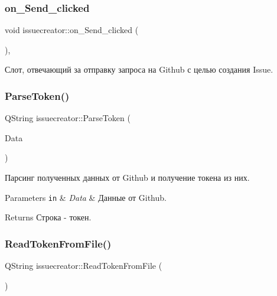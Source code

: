 \subsubsection{\texorpdfstring{on\+\_\+\+Send\+\_\+clicked}{on\_Send\_clicked}}
{\footnotesize\ttfamily void issuecreator\+::on\+\_\+\+Send\+\_\+clicked (\begin{DoxyParamCaption}{ }\end{DoxyParamCaption})\hspace{0.3cm}{\ttfamily [private]}, {\ttfamily [slot]}}



Слот, отвечающий за отправку запроса на Github с целью создания Issue. 

\mbox{\label{classissuecreator_a32184b3842bd6352faeef506b85c649a}} 
\subsubsection{\texorpdfstring{Parse\+Token()}{ParseToken()}}
{\footnotesize\ttfamily Q\+String issuecreator\+::\+Parse\+Token (\begin{DoxyParamCaption}\item[{Q\+String}]{Data }\end{DoxyParamCaption})}



Парсинг полученных данных от Github и получение токена из них. 


\begin{DoxyParams}[1]{Parameters}
\mbox{\tt in}  & {\em Data} & Данные от Github. \\
\hline
\end{DoxyParams}
\begin{DoxyReturn}{Returns}
Строка -\/ токен. 
\end{DoxyReturn}
\mbox{\label{classissuecreator_a52fc815f5dd3099817a1613f4af9de9b}} 
\subsubsection{\texorpdfstring{Read\+Token\+From\+File()}{ReadTokenFromFile()}}
{\footnotesize\ttfamily Q\+String issuecreator\+::\+Read\+Token\+From\+File (\begin{DoxyParamCaption}{ }\end{DoxyParamCaption})}



